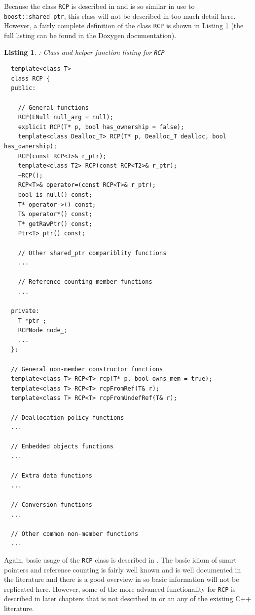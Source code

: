 \documentclass[pdf,ps2pdf,11pt]{SANDreport}
\newtheorem{listing}{Listing}
\begin{document}
Because the class {}\texttt{RCP} is described in
{}\cite{RefCountPtrBeginnersGuide} and is so similar in use to
{}\texttt{boost::shared\_ptr}, this class will not be described in too
much detail here.  However, a fairly complete definition of the class
{}\texttt{RCP} is shown in Listing {}\ref{listing:RCP} (the full
listing can be found in the Doxygen documentation).

\begin{listing}: Class and helper function listing for {}\texttt{RCP} \\
\label{listing:RCP}
{\small\begin{verbatim}
  template<class T>
  class RCP {
  public:

    // General functions
    RCP(ENull null_arg = null);
    explicit RCP(T* p, bool has_ownership = false);
    template<class Dealloc_T> RCP(T* p, Dealloc_T dealloc, bool has_ownership);
    RCP(const RCP<T>& r_ptr);
    template<class T2> RCP(const RCP<T2>& r_ptr);
    ~RCP();
    RCP<T>& operator=(const RCP<T>& r_ptr);
    bool is_null() const;
    T* operator->() const;
    T& operator*() const;
    T* getRawPtr() const;
    Ptr<T> ptr() const;
  
    // Other shared_ptr compariblity functions
    ...
  
    // Reference counting member functions
    ...
  
  private:
    T *ptr_;
    RCPNode node_;
    ...
  };

  // General non-member constructor functions
  template<class T> RCP<T> rcp(T* p, bool owns_mem = true);
  template<class T> RCP<T> rcpFromRef(T& r);
  template<class T> RCP<T> rcpFromUndefRef(T& r);

  // Deallocation policy functions
  ...

  // Embedded objects functions
  ...

  // Extra data functions
  ...
 
  // Conversion functions
  ...

  // Other common non-member functions
  ...

\end{verbatim}}
\end{listing}

Again, basic usage of the {}\texttt{RCP} class is described in
{}\cite{RefCountPtrBeginnersGuide}.  The basic idiom of smart pointers and
reference counting is fairly well known and is well documented in the
literature and there is a good overview in {}\cite{RefCountPtrBeginnersGuide}
so basic information will not be replicated here.  However, some of the more
advanced functionality for {}\texttt{RCP} is described in later chapters that
is not described in {}\cite{RefCountPtrBeginnersGuide} or an any of the
existing C++ literature.
\end{document}
